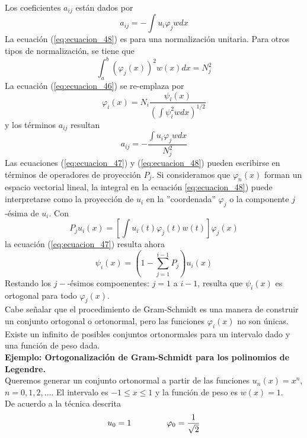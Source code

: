Los coeficientes $a_{ij}$ están dados por
\begin{equation}
a_{ij} = - \int u_{i} \varphi_{j} w dx
\label{eq:ecuacion_48}
\end{equation}
La ecuación (\ref{eq:ecuacion_48}) es para una normalización unitaria. Para otros tipos de normalización, se tiene que
\[ \int_{a}^{b} \left(\varphi_{j} (x) \right)^{2} w(x) dx =  N_{j}^{2} \]
La ecuación (\ref{eq:ecuacion_46}) se re-emplaza por
\begin{equation}
\varphi_{i}(x) =  N_{i} \dfrac{\psi_{i}(x)}{\left( \int \psi_{i}^{2} w dx \right)^{1/2}}
\label{eq:ecuacion_46a}
\end{equation}
y los términos $a_{ij}$ resultan
\begin{equation}
a_{ij} = - \dfrac{\int u_{i} \varphi_{j} w dx}{N_{j}^{2}}
\label{eq:ecuacion_48a}
\end{equation}
Las ecuaciones (\ref{eq:ecuacion_47}) y (\ref{eq:ecuacion_48}) pueden escribirse en términos de operadores de proyección $P_{j}$. Si consideramos que $\varphi_{n}(x)$ forman un espacio vectorial lineal, la integral en la ecuación \ref{eq:ecuacion_48}) puede interpretarse como la proyección de $u_{i}$ en la ''coordenada'' $\varphi_{j}$ o la componente $j$-ésima de $u_{i}$. Con
\[ P_{j} u_{i}(x) = \left[ \int u_{i}(t) \varphi_{j}(t) w(t) \right] \varphi_{j}(x) \]
la ecuación (\ref{eq:ecuacion_47}) resulta ahora
\begin{equation}
\psi_{i}(x) = \left( 1 - \sum_{j=1}^{i-1} P_{j} \right) u_{i}(x)
\label{eq:ecuacion_47a}
\end{equation}
Restando los $j-$-ésimos compoenentes: $j=1$ a $i-1$, resulta que $\psi_{i}(x)$ es ortogonal para todo $\varphi_{j}(x)$.\\
Cabe señalar que el procedimiento de Gram-Schmidt es una manera de construir un conjunto ortogonal o ortonormal, pero las funciones $\varphi_{i}(x)$ no son únicas. Existe un infinito de posibles conjuntos ortonormales para un intervalo dado y una función de peso dada.
\\
\textbf{Ejemplo: Ortogonalización de Gram-Schmidt para los polinomios de Legendre.}
\\
Queremos generar un conjunto ortonormal a partir de las funciones $u_{n}(x)=x^{n}$, $n=0,1,2,\ldots$. El intervalo es $-1 \leq x \leq 1$ y la función de peso es $w(x)=1$.
\\
De acuerdo a la técnica descrita
\begin{equation}
u_{0}=1 \hspace{1.5cm} \varphi_{0} =  \dfrac{1}{\sqrt{2}}
\label{eq:ecuacion_49}
\end{equation}
